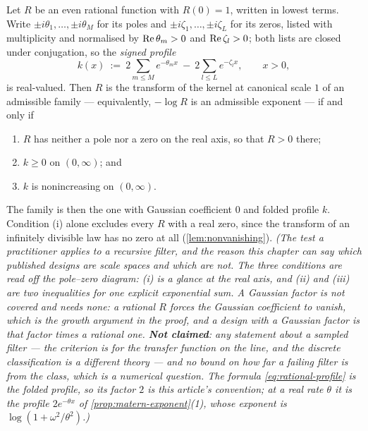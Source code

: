 \begin{proposition}
\label{prop:rational-criterion}
Let $R$ be an even rational function with $R(0) = 1$, written in lowest terms. Write
$\pm i\theta_1,\dots,\pm i\theta_M$ for its poles and $\pm i\zeta_1,\dots,\pm i\zeta_L$ for its
zeros, listed with multiplicity and normalised by $\operatorname{Re}\theta_m > 0$ and $\operatorname{Re}\zeta_l > 0$; both
lists are closed under conjugation, so the \emph{signed profile}
\begin{equation}\label{eq:rational-profile}
  k(x) \ :=\ 2\sum_{m \le M} e^{-\theta_m x} \ -\ 2\sum_{l \le L} e^{-\zeta_l x},
  \qquad x > 0,
\end{equation}
is real-valued. Then $R$ is the transform of the kernel at canonical scale $1$ of an admissible
family --- equivalently, $-\log R$ is an admissible exponent --- if and only if
\begin{enumerate}
\item $R$ has neither a pole nor a zero on the real axis, so that $R > 0$ there;
\item $k \ge 0$ on $(0,\infty)$; and
\item $k$ is nonincreasing on $(0,\infty)$.
\end{enumerate}
The family is then the one with Gaussian coefficient $0$ and folded profile $k$. Condition (i)
alone excludes every $R$ with a real zero, since the transform of an infinitely divisible law has
no zero at all (\ref{lem:nonvanishing}).
\statusT\quad\emph{(The test a practitioner applies to a recursive filter, and the reason this
chapter can say which published designs are scale spaces and which are not. The three conditions
are read off the pole--zero diagram: (i) is a glance at the real axis, and (ii) and (iii) are two
inequalities for one explicit exponential sum. A Gaussian factor is not covered and needs none: a
rational $R$ forces the Gaussian coefficient to vanish, which is the growth argument in the proof,
and a design with a Gaussian factor is that factor times a rational one. \textbf{Not claimed}: any
statement about a \emph{sampled} filter --- the criterion is for the transfer function on the
line, and the discrete classification is a different theory --- and no bound on how far a failing
filter is from the class, which is a numerical question. The formula \ref{eq:rational-profile} is
the folded profile, so its factor $2$ is this article's convention; at a real rate $\theta$ it is
the profile $2e^{-\theta x}$ of \ref{prop:matern-exponent}(1), whose exponent is
$\log(1 + \omega^2/\theta^2)$.)}
\end{proposition}

